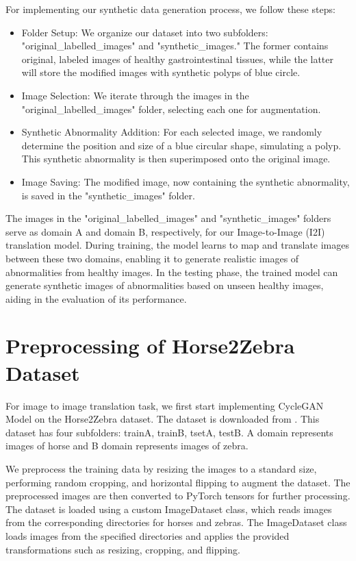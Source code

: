 \documentclass[UKenglish,12pt]{master-style}
\begin{document}
For implementing our synthetic data generation process, we follow these steps:
\begin{itemize}
\item Folder Setup: We organize our dataset into two subfolders: "original\_labelled\_images" and "synthetic\_images." The former contains original, labeled images of healthy gastrointestinal tissues, while the latter will store the modified images with synthetic polyps of blue circle.

\item Image Selection: We iterate through the images in the "original\_labelled\_images" folder, selecting each one for augmentation.

\item Synthetic Abnormality Addition: For each selected image, we randomly determine the position and size of a blue circular shape, simulating a polyp. This synthetic abnormality is then superimposed onto the original image.

\item Image Saving: The modified image, now containing the synthetic abnormality, is saved in the "synthetic\_images" folder.
\end{itemize}

The images in the "original\_labelled\_images" and "synthetic\_images" folders serve as domain A and domain B, respectively, for our Image-to-Image (I2I) translation model. During training, the model learns to map and translate images between these two domains, enabling it to generate realistic images of abnormalities from healthy images. In the testing phase, the trained model can generate synthetic images of abnormalities based on unseen healthy images, aiding in the evaluation of its performance.

\section{Preprocessing of Horse2Zebra Dataset}

For image to image translation task, we first start implementing CycleGAN Model on the Horse2Zebra dataset. The dataset is downloaded from \cite{kaggle_horse2zebra_dataset}. This dataset has four subfolders: trainA, trainB, tsetA, testB. A domain represents images of horse and B domain represents images of zebra.

We preprocess the training data by resizing the images to a standard size, performing random cropping, and horizontal flipping to augment the dataset. The preprocessed images are then converted to PyTorch tensors for further processing. The dataset is loaded using a custom ImageDataset class, which reads images from the corresponding directories for horses and zebras. The ImageDataset class loads images from the specified directories and applies the provided transformations such as resizing, cropping, and flipping.
\end{document}
